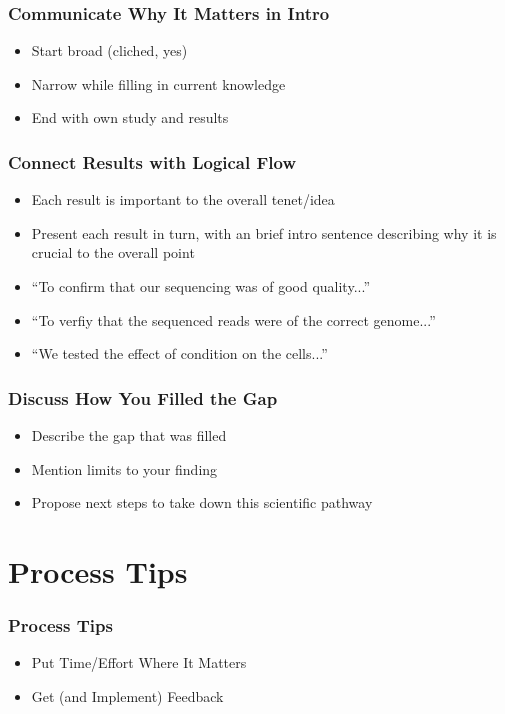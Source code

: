 \documentclass[14pt,handout]{beamer}
\begin{document}
\begin{frame}
\frametitle{Communicate Why It Matters in Intro}
\begin{itemize}
	\item<+-> Start broad (cliched, yes)
	\item<+-> Narrow while filling in current knowledge
	\item<+-> End with own study and results
\end{itemize}
\end{frame}

\begin{frame}
\frametitle{Connect Results with Logical Flow}
\begin{itemize}
	\item<+-> Each result is important to the overall tenet/idea
	\item<+-> Present each result in turn, with an brief intro sentence describing why it is crucial to the overall point
	\item<+-> ``To confirm that our sequencing was of good quality...''
	\item<+-> ``To verfiy that the sequenced reads were of the correct genome...''
	\item<+-> ``We tested the effect of condition on the cells...''
\end{itemize}
\end{frame}

\begin{frame}
\frametitle{Discuss How You Filled the Gap}
\begin{itemize}
	\item<+-> Describe the gap that was filled
	\item<+-> Mention limits to your finding
	\item<+-> Propose next steps to take down this scientific pathway
\end{itemize}
\end{frame}

\section{Process Tips}

\begin{frame}
\frametitle{Process Tips}
\begin{itemize}
	\item<+-> Put Time/Effort Where It Matters
	\item<+-> Get (and Implement) Feedback
\end{itemize}
\end{frame}
\end{document}
